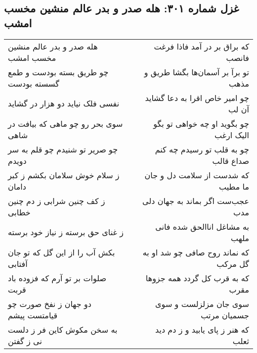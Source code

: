 \begin{center}
\section*{غزل شماره ۳۰۱: هله صدر و بدر عالم منشین مخسب امشب}
\label{sec:0301}
\begin{longtable}{l p{0.5cm} r}
هله صدر و بدر عالم منشین مخسب امشب
&&
که براق بر در آمد فاذا فرغت فانصب
\\
چو طریق بسته بودست و طمع گسسته بودست
&&
تو برآ بر آسمان‌ها بگشا طریق و مذهب
\\
نفسی فلک نیاید دو هزار در گشاید
&&
چو امیر خاص اقرا به دعا گشاید آن لب
\\
سوی بحر رو چو ماهی که بیافت در شاهی
&&
چو بگوید او چه خواهی تو بگو الیک ارغب
\\
چو صریر تو شنیدم چو قلم به سر دویدم
&&
چو به قلب تو رسیدم چه کنم صداع قالب
\\
ز سلام خوش سلامان بکشم ز کبر دامان
&&
که شدست از سلامت دل و جان ما مطیب
\\
ز کف چنین شرابی ز دم چنین خطابی
&&
عجب‌ست اگر بماند به جهان دلی مدب
\\
ز غنای حق برسته ز نیاز خود برسته
&&
به مشاغل اناالحق شده فانی ملهب
\\
بکش آب را از این گل که تو جان آفتابی
&&
که نماند روح صافی چو شد او به گل مرکب
\\
صلوات بر تو آرم که فزوده باد قربت
&&
که به قرب کل گردد همه جزوها مقرب
\\
دو جهان ز نفخ صورت چو قیامتست پیشم
&&
سوی جان مزلزلست و سوی جسمیان مرتب
\\
به سخن مکوش کاین فر ز دلست نی ز گفتن
&&
که هنر ز پای یابید و ز دم دید ثعلب
\\
\end{longtable}
\end{center}
